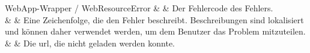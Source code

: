 \begin{interfacedesc}{WebApp-Wrapper / WebResourceError}
           &  & Der Fehlercode des Fehlers. \\ \hline
    &  & Eine Zeichenfolge, die den Fehler beschreibt. Beschreibungen sind lokalisiert und können daher verwendet werden, um dem Benutzer das Problem mitzuteilen. \\ \hline
        &  & Die \ac{url}, die nicht geladen werden konnte. \\ \hline
\end{interfacedesc}
